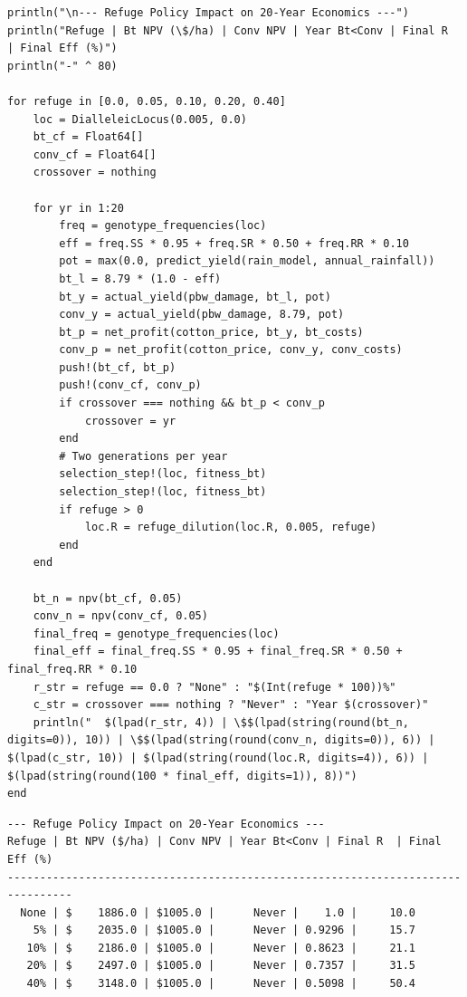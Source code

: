 \begin{verbatim}
println("\n--- Refuge Policy Impact on 20-Year Economics ---")
println("Refuge | Bt NPV (\$/ha) | Conv NPV | Year Bt<Conv | Final R  | Final Eff (%)")
println("-" ^ 80)

for refuge in [0.0, 0.05, 0.10, 0.20, 0.40]
    loc = DialleleicLocus(0.005, 0.0)
    bt_cf = Float64[]
    conv_cf = Float64[]
    crossover = nothing

    for yr in 1:20
        freq = genotype_frequencies(loc)
        eff = freq.SS * 0.95 + freq.SR * 0.50 + freq.RR * 0.10
        pot = max(0.0, predict_yield(rain_model, annual_rainfall))
        bt_l = 8.79 * (1.0 - eff)
        bt_y = actual_yield(pbw_damage, bt_l, pot)
        conv_y = actual_yield(pbw_damage, 8.79, pot)
        bt_p = net_profit(cotton_price, bt_y, bt_costs)
        conv_p = net_profit(cotton_price, conv_y, conv_costs)
        push!(bt_cf, bt_p)
        push!(conv_cf, conv_p)
        if crossover === nothing && bt_p < conv_p
            crossover = yr
        end
        # Two generations per year
        selection_step!(loc, fitness_bt)
        selection_step!(loc, fitness_bt)
        if refuge > 0
            loc.R = refuge_dilution(loc.R, 0.005, refuge)
        end
    end

    bt_n = npv(bt_cf, 0.05)
    conv_n = npv(conv_cf, 0.05)
    final_freq = genotype_frequencies(loc)
    final_eff = final_freq.SS * 0.95 + final_freq.SR * 0.50 + final_freq.RR * 0.10
    r_str = refuge == 0.0 ? "None" : "$(Int(refuge * 100))%"
    c_str = crossover === nothing ? "Never" : "Year $(crossover)"
    println("  $(lpad(r_str, 4)) | \$$(lpad(string(round(bt_n, digits=0)), 10)) | \$$(lpad(string(round(conv_n, digits=0)), 6)) | $(lpad(c_str, 10)) | $(lpad(string(round(loc.R, digits=4)), 6)) | $(lpad(string(round(100 * final_eff, digits=1)), 8))")
end
\end{verbatim}




\begin{verbatim}
--- Refuge Policy Impact on 20-Year Economics ---
Refuge | Bt NPV ($/ha) | Conv NPV | Year Bt<Conv | Final R  | Final Eff (%)
--------------------------------------------------------------------------------
  None | $    1886.0 | $1005.0 |      Never |    1.0 |     10.0
    5% | $    2035.0 | $1005.0 |      Never | 0.9296 |     15.7
   10% | $    2186.0 | $1005.0 |      Never | 0.8623 |     21.1
   20% | $    2497.0 | $1005.0 |      Never | 0.7357 |     31.5
   40% | $    3148.0 | $1005.0 |      Never | 0.5098 |     50.4
\end{verbatim}



